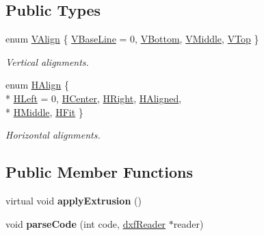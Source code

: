 \subsection*{Public Types}
\begin{DoxyCompactItemize}
\item 
enum \hyperlink{classDRW__Text_a369c571137713ac08c5a5a9b66ff6c27}{V\-Align} \{ \hyperlink{classDRW__Text_a369c571137713ac08c5a5a9b66ff6c27a26e0d96529d0c6edf8fe94c09ffd1661}{V\-Base\-Line} = 0, 
\hyperlink{classDRW__Text_a369c571137713ac08c5a5a9b66ff6c27a64c2355b0923f0634c45002f571c9fba}{V\-Bottom}, 
\hyperlink{classDRW__Text_a369c571137713ac08c5a5a9b66ff6c27adf2dfb4d3e854d4c660246808495152e}{V\-Middle}, 
\hyperlink{classDRW__Text_a369c571137713ac08c5a5a9b66ff6c27ad6c53af0a564a39018d403af25aa97e3}{V\-Top}
 \}
\begin{DoxyCompactList}\small\item\em Vertical alignments. \end{DoxyCompactList}\item 
enum \hyperlink{classDRW__Text_a66511da21199b0ab967fa951bc339f2d}{H\-Align} \{ \\*
\hyperlink{classDRW__Text_a66511da21199b0ab967fa951bc339f2da2fca970851f2bddb3f018307e47f653c}{H\-Left} = 0, 
\hyperlink{classDRW__Text_a66511da21199b0ab967fa951bc339f2dacae7fa84a0beaf06577027631f445225}{H\-Center}, 
\hyperlink{classDRW__Text_a66511da21199b0ab967fa951bc339f2dafc3e7b70ef3f4cb5bf2228f0fe2dfc8f}{H\-Right}, 
\hyperlink{classDRW__Text_a66511da21199b0ab967fa951bc339f2da3f5e5f69673e0b948de41c8e16ffd131}{H\-Aligned}, 
\\*
\hyperlink{classDRW__Text_a66511da21199b0ab967fa951bc339f2da9705528a85e9416e32dbb959ad22a584}{H\-Middle}, 
\hyperlink{classDRW__Text_a66511da21199b0ab967fa951bc339f2da3b8fe44dc62bffe5c97d7b96ef1b3c23}{H\-Fit}
 \}
\begin{DoxyCompactList}\small\item\em Horizontal alignments. \end{DoxyCompactList}\end{DoxyCompactItemize}
\subsection*{Public Member Functions}
\begin{DoxyCompactItemize}
\item 
\hypertarget{classDRW__Text_acdb987486bf1a47c585bcef48e8c22b5}{virtual void {\bfseries apply\-Extrusion} ()}\label{classDRW__Text_acdb987486bf1a47c585bcef48e8c22b5}

\item 
\hypertarget{classDRW__Text_a4df3b6e6599bed2f735e4bd896f69208}{void {\bfseries parse\-Code} (int code, \hyperlink{classdxfReader}{dxf\-Reader} $\ast$reader)}\label{classDRW__Text_a4df3b6e6599bed2f735e4bd896f69208}

\end{DoxyCompactItemize}
